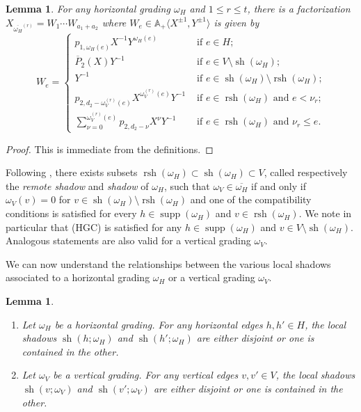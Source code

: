 \documentclass{amsart}
\newtheorem{lemma}[theorem]{Lemma}
\renewcommand{\AA}{\mathbb{A}}
\newcommand{\supp}{\operatorname{supp}}
\newcommand{\rsh}{\operatorname{rsh}}
\newcommand{\sh}{\operatorname{sh}}
\newenvironment{enumeratea}{\begin{enumerate}[\upshape (a)]}
                           {\end{enumerate}}
\begin{document}
\begin{lemma}
 For any horizontal grading $\omega_H$ and $1\le r\le t$, there is a factorization $X_{\overline{\omega_H}^{(r)}}=W_1\cdots W_{a_1+a_2}$ where $W_e\in\AA_+\langle X^{\pm1},Y^{\pm1}\rangle$ is given by
 \[W_e=\begin{cases}p_{1,\omega_H(e)}X^{-1}Y^{\omega_H(e)} & \text{ if $e\in H$;}\\ \overline{P}_2(X)Y^{-1} & \text{ if $e\in V\setminus\sh(\omega_H);$}\\ Y^{-1} & \text{ if $e\in\sh(\omega_H)\setminus\rsh(\omega_H)$;}\\ p_{2,d_2-\omega_V^{(r)}(e)}X^{\omega_V^{(r)}(e)}Y^{-1} & \text{ if $e\in\rsh(\omega_H)$ and $e<\nu_r$;}\\ \sum\limits_{\nu=0}^{\omega_V^{(r)}(e)}p_{2,d_2-\nu}X^\nu Y^{-1} & \text{ if $e\in\rsh(\omega_H)$ and $\nu_r\le e$.}\end{cases}\]
\end{lemma}
\begin{proof}
 This is immediate from the definitions.
\end{proof}


 

Following \cite[Lemma 4.4]{rupel2}, there exists subsets $\rsh(\omega_H)\subset\sh(\omega_H)\subset V$, called respectively the \emph{remote shadow} and \emph{shadow} of $\omega_H$, such that $\omega_V\in\overline{\omega_H}$ if and only if $\omega_V(v)=0$ for $v\in\sh(\omega_H)\setminus\rsh(\omega_H)$ and one of the compatibility conditions is satisfied for every $h\in\supp(\omega_H)$ and $v\in\rsh(\omega_H)$.  We note in particular that (HGC) is satisfied for any $h\in\supp(\omega_H)$ and $v\in V\setminus\sh(\omega_H)$.  Analogous statements are also valid for a vertical grading $\omega_V$.

















 

 We can now understand the relationships between the various local shadows associated to a horizontal grading $\omega_H$ or a vertical grading $\omega_V$.
 \begin{lemma}\label{le:shadow containment}\mbox{}
  \begin{enumeratea}
   \item Let $\omega_H$ be a horizontal grading.  For any horizontal edges $h,h'\in H$, the local shadows $\sh(h;\omega_H)$ and $\sh(h';\omega_H)$ are either disjoint or one is contained in the other.
   \item Let $\omega_V$ be a vertical grading.  For any vertical edges $v,v'\in V$, the local shadows $\sh(v;\omega_V)$ and $\sh(v';\omega_V)$ are either disjoint or one is contained in the other.
  \end{enumeratea}
 \end{lemma}
 
\end{document}

